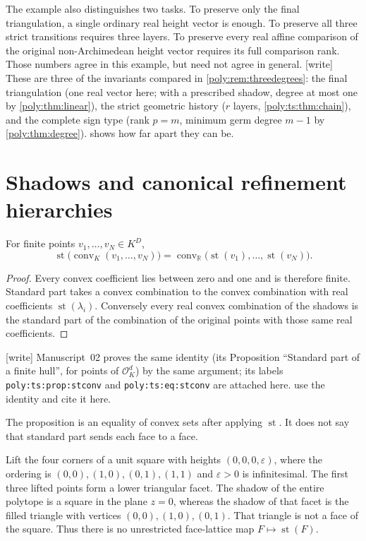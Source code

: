\documentclass[11pt,a4paper]{article}
\numberwithin{equation}{section}
\theoremstyle{plain}
\newcommand{\wtag}{\textup{[write]}}%
\newcommand{\R}{\mathbb R}
\newcommand{\eps}{\varepsilon}
\newcommand{\st}{\operatorname{st}}
\newcommand{\conv}{\operatorname{conv}}
\newcommand{\cO}{\mathcal{O}}
\begin{document}
The example also distinguishes two tasks. To preserve only the final
triangulation, a single ordinary real height vector is enough. To preserve
all three strict transitions requires three layers. To preserve every
real affine comparison of the original non-Archimedean height vector
requires its full comparison rank. Those numbers agree in this example,
but need not agree in general.
\wtag{} These are three of the invariants compared in
\cref{poly:rem:threedegrees}: the final triangulation (one real vector
here; with a prescribed shadow, degree at most one by \cref{poly:thm:linear}),
the strict geometric history ($r$ layers, \cref{poly:ts:thm:chain}), and the
complete sign type (rank $p=m$, minimum germ degree $m-1$ by
\cref{poly:thm:degree}).  shows how far apart
they can be.

\section{Shadows and canonical refinement hierarchies}
\label{poly:sec:shadows}

\begin{proposition}
\label{poly:prop:stconv}\label{poly:ts:prop:stconv}
For finite points $v_1,\ldots,v_N\in K^D$,
\begin{equation}\label{poly:ts:eq:stconv}
 \st\bigl(\conv_K(v_1,\ldots,v_N)\bigr)
 =\conv_{\R}\bigl(\st(v_1),\ldots,\st(v_N)\bigr).
\end{equation}
\end{proposition}
\begin{proof}
Every convex coefficient lies between zero and one and is therefore
finite. Standard part takes a convex combination to the convex combination
with real coefficients $\st(\lambda_i)$. Conversely every real convex
combination of the shadows is the standard part of the combination of the
original points with those same real coefficients.
\end{proof}
\wtag{} Manuscript~02 proves the same identity (its Proposition ``Standard
part of a finite hull'', for points of $\cO_K^d$) by the same argument; its
labels \texttt{poly:ts:prop:stconv} and \texttt{poly:ts:eq:stconv} are
attached here.  use the
identity and cite it here.

The proposition is an equality of convex sets after applying $\st$.
It does not say that standard part sends each face to a face.

\begin{example}\label{poly:ex:nonface}
Lift the four corners of a unit square with heights $(0,0,0,\eps)$,
where the ordering is $(0,0),(1,0),(0,1),(1,1)$ and $\eps>0$ is
infinitesimal. The first three lifted points form a lower triangular facet.
The shadow of the entire polytope is a square in the plane $z=0$, whereas
the shadow of that facet is the filled triangle with vertices
$(0,0),(1,0),(0,1)$. That triangle is not a face of the square. Thus there
is no unrestricted face-lattice map $F\mapsto\st(F)$.
\end{example}
\end{document}
